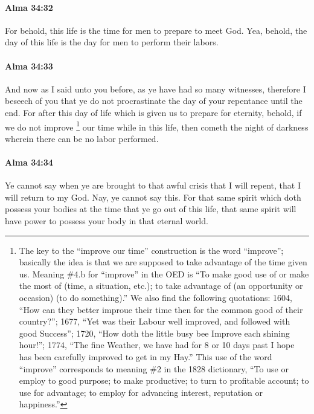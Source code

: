 		\paragraph{Alma 34:32} %
			\label{ALMA-34-32}
			
			For behold, this life is the time for men to prepare to meet God.
			Yea, behold, the day of this life is the day for men to perform their labors.
			
		\paragraph{Alma 34:33} %
			\label{ALMA-34-33}
			
			And now as I said unto you before,
			as ye have had so many witnesses,
			therefore I beseech of you
			that ye do not procrastinate the day of your repentance until the end.
			For after this day of life which is given us to prepare for eternity,
			behold, if we do not improve%
				\footnote{%
					The key to the ``improve our time'' construction is the word ``improve''; basically the idea is that we are supposed to take advantage of the time given us. Meaning \#4.b for ``improve'' in the OED is ``To make good use of or make the most of (time, a situation, etc.); to take advantage of (an opportunity or occasion) (to do something).'' We also find the following quotations: 1604, ``How can they better improue their time then for the common good of their country?''; 1677, ``Yet was their Labour well improved, and followed with good Success''; 1720, ``How doth the little busy bee Improve each shining hour!''; 1774, ``The fine Weather, we have had for 8 or 10 days past I hope has been carefully improved to get in my Hay.'' This use of the word ``improve'' corresponds to meaning \#2 in the 1828 dictionary, ``To use or employ to good purpose; to make productive; to turn to profitable account; to use for advantage; to employ for advancing interest, reputation or happiness.''
					}
			our time
			while in this life,
			then cometh the night of darkness wherein there can be no labor performed.
			
		\paragraph{Alma 34:34} %
			\label{ALMA-34-34}
			
			Ye cannot say when ye are brought to that awful crisis
			that I will repent,
			that I will return to my God.
			Nay, ye cannot say this.
			For that same spirit which doth possess your bodies
			at the time that ye go out of this life,
			that same spirit will have power to possess your body in that eternal world.
			
